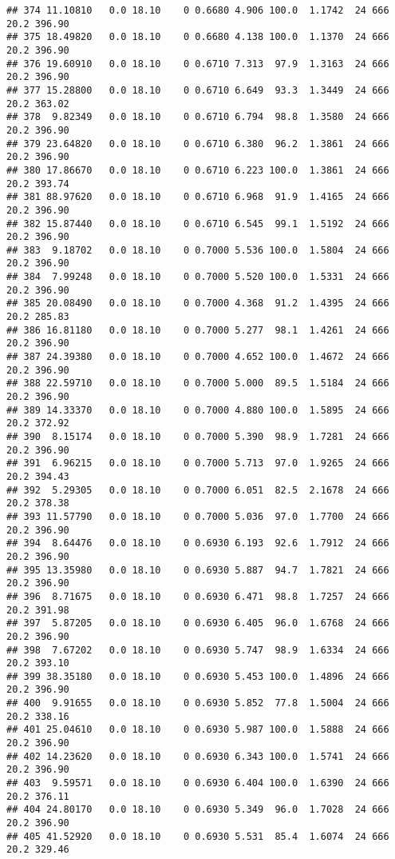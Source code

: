 \documentclass[
]{article}
\begin{document}
\begin{verbatim}
## 374 11.10810   0.0 18.10    0 0.6680 4.906 100.0  1.1742  24 666    20.2 396.90
## 375 18.49820   0.0 18.10    0 0.6680 4.138 100.0  1.1370  24 666    20.2 396.90
## 376 19.60910   0.0 18.10    0 0.6710 7.313  97.9  1.3163  24 666    20.2 396.90
## 377 15.28800   0.0 18.10    0 0.6710 6.649  93.3  1.3449  24 666    20.2 363.02
## 378  9.82349   0.0 18.10    0 0.6710 6.794  98.8  1.3580  24 666    20.2 396.90
## 379 23.64820   0.0 18.10    0 0.6710 6.380  96.2  1.3861  24 666    20.2 396.90
## 380 17.86670   0.0 18.10    0 0.6710 6.223 100.0  1.3861  24 666    20.2 393.74
## 381 88.97620   0.0 18.10    0 0.6710 6.968  91.9  1.4165  24 666    20.2 396.90
## 382 15.87440   0.0 18.10    0 0.6710 6.545  99.1  1.5192  24 666    20.2 396.90
## 383  9.18702   0.0 18.10    0 0.7000 5.536 100.0  1.5804  24 666    20.2 396.90
## 384  7.99248   0.0 18.10    0 0.7000 5.520 100.0  1.5331  24 666    20.2 396.90
## 385 20.08490   0.0 18.10    0 0.7000 4.368  91.2  1.4395  24 666    20.2 285.83
## 386 16.81180   0.0 18.10    0 0.7000 5.277  98.1  1.4261  24 666    20.2 396.90
## 387 24.39380   0.0 18.10    0 0.7000 4.652 100.0  1.4672  24 666    20.2 396.90
## 388 22.59710   0.0 18.10    0 0.7000 5.000  89.5  1.5184  24 666    20.2 396.90
## 389 14.33370   0.0 18.10    0 0.7000 4.880 100.0  1.5895  24 666    20.2 372.92
## 390  8.15174   0.0 18.10    0 0.7000 5.390  98.9  1.7281  24 666    20.2 396.90
## 391  6.96215   0.0 18.10    0 0.7000 5.713  97.0  1.9265  24 666    20.2 394.43
## 392  5.29305   0.0 18.10    0 0.7000 6.051  82.5  2.1678  24 666    20.2 378.38
## 393 11.57790   0.0 18.10    0 0.7000 5.036  97.0  1.7700  24 666    20.2 396.90
## 394  8.64476   0.0 18.10    0 0.6930 6.193  92.6  1.7912  24 666    20.2 396.90
## 395 13.35980   0.0 18.10    0 0.6930 5.887  94.7  1.7821  24 666    20.2 396.90
## 396  8.71675   0.0 18.10    0 0.6930 6.471  98.8  1.7257  24 666    20.2 391.98
## 397  5.87205   0.0 18.10    0 0.6930 6.405  96.0  1.6768  24 666    20.2 396.90
## 398  7.67202   0.0 18.10    0 0.6930 5.747  98.9  1.6334  24 666    20.2 393.10
## 399 38.35180   0.0 18.10    0 0.6930 5.453 100.0  1.4896  24 666    20.2 396.90
## 400  9.91655   0.0 18.10    0 0.6930 5.852  77.8  1.5004  24 666    20.2 338.16
## 401 25.04610   0.0 18.10    0 0.6930 5.987 100.0  1.5888  24 666    20.2 396.90
## 402 14.23620   0.0 18.10    0 0.6930 6.343 100.0  1.5741  24 666    20.2 396.90
## 403  9.59571   0.0 18.10    0 0.6930 6.404 100.0  1.6390  24 666    20.2 376.11
## 404 24.80170   0.0 18.10    0 0.6930 5.349  96.0  1.7028  24 666    20.2 396.90
## 405 41.52920   0.0 18.10    0 0.6930 5.531  85.4  1.6074  24 666    20.2 329.46

\end{verbatim}
\end{document}
